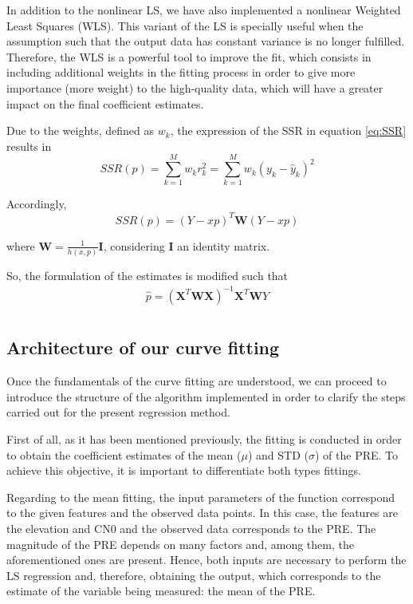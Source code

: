 \documentclass[a4paper, report, oneside, UKenglish]{memoir}
\begin{document}
In addition to the nonlinear LS, we have also implemented a nonlinear Weighted Least Squares (WLS). This variant of the LS is specially useful when the assumption such that the output data has constant variance is no longer fulfilled. Therefore, the WLS is a powerful tool to improve the fit, which consists in including additional weights in the fitting process in order to give more importance (more weight) to the high-quality data, which will have a greater impact on the final coefficient estimates. 

Due to the weights, defined as $w_{k}$, the expression of the SSR in equation \eqref{eq:SSR} results in
\begin{equation}\label{eq:SSR_2}
    SSR(p) = \sum\limits_{k=1}^{M}w_{k}{r}_{k}^{2} = \sum\limits_{k=1}^{M}w_{k}(y_k - \hat{y}_k)^2
\end{equation}

Accordingly, 
\begin{equation}
    SSR(p) = (Y - xp)^T\textbf{W}(Y - xp)
\end{equation} 

where $\textbf{W} = \frac{1}{h(x,p)}\textbf{I}$, considering $\textbf{I}$ an identity matrix. 

So, the formulation of the estimates is modified such that
\begin{equation}\label{eq:estimatorWLS}
\begin{split}
    \hat{p} = (\textbf{X}^{T}\textbf{W}\textbf{X})^{-1}\textbf{X}^{T}\textbf{W}Y\\
\end{split}
\end{equation}

\subsection{Architecture of our curve fitting}

Once the fundamentals of the curve fitting are understood, we can proceed to introduce the structure of the algorithm implemented in order to clarify the steps carried out for the present regression method.

First of all, as it has been mentioned previously, the fitting is conducted in order to obtain the coefficient estimates of the mean ($\mu$) and STD ($\sigma$) of the PRE. To achieve this objective, it is important to differentiate both types fittings. 

Regarding to the mean fitting, the input parameters of the function correspond to the given features and the observed data points. In this case, the features are the elevation and CN0 and the observed data corresponds to the PRE. The magnitude of the PRE depends on many factors and, among them, the aforementioned ones are present. Hence, both inputs are necessary to perform the LS regression and, therefore, obtaining the output, which corresponds to the estimate of the variable being measured: the mean of the PRE.  
\end{document}
